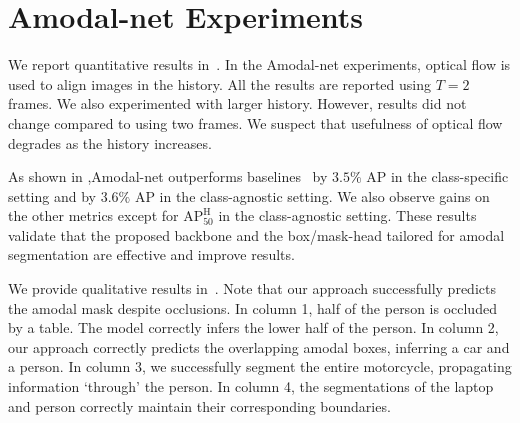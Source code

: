 \section{Amodal-net Experiments}

We report quantitative results in~. 
In the Amodal-net experiments, optical flow is used to align images in the history. All the results are reported using $T = 2$ frames. We also experimented with larger history. However, results did not change compared to using two frames. We suspect that usefulness of optical flow degrades as the history increases. %

As shown in ,Amodal-net outperforms baselines~\cite{hu2019sail} by $3.5\%$ AP in the class-specific setting and by $3.6\%$ %
AP in the class-agnostic setting. We also observe gains on the other metrics except for $\text{AP}_{\text{50}}^{\text{H}}$ in the class-agnostic setting. These results validate that the proposed backbone and the box/mask-head tailored for amodal segmentation are effective and improve results.


We provide qualitative results in~. Note that our approach successfully predicts the amodal mask despite occlusions. 
In column 1, half of the person is occluded by a table. The model correctly infers the lower half of the person. In column 2, our approach correctly predicts the overlapping amodal boxes, inferring a car and a person.
In column 3, we successfully segment  the entire motorcycle, propagating information `through' the person.
In column 4, the segmentations of the laptop and person correctly maintain their corresponding boundaries.   



